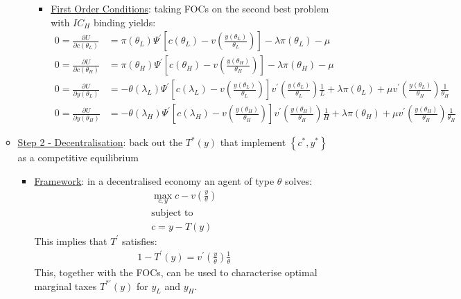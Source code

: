 \documentclass{article}
\begin{document}
\begin{itemize}
\begin{itemize}
\begin{itemize}
\begin{itemize}
                \item  \underline{First Order Conditions}: taking FOCs on the second best problem with $IC_{H}$ binding yields:
                \begin{align*}
                    0 = \frac{\partial U}{\partial c(\theta_{L})} &= \pi(\theta_{L}) \Psi^{'}[c(\theta_{L}) - v(\frac{y(\theta_{L})}{\theta_{L}})] - \lambda \pi(\theta_{L}) - \mu \tag{1} \\
                    0 = \frac{\partial U}{\partial c(\theta_{H})} &= \pi(\theta_{H}) \Psi^{'}[c(\theta_{H}) - v(\frac{y(\theta_{H})}{\theta_{H}})] - \lambda \pi(\theta_{H}) - \mu \tag{2} \\
                    0 = \frac{\partial U}{\partial y(\theta_{L})} &= -\theta(\lambda_{L}) \Psi^{'}[c(\lambda_{L}) - v(\frac{y(\theta_{L})}{\theta_{L}})] v^{'}(\frac{y(\theta_{L})}{\theta_{L}}) \frac{1}{L} + \lambda \pi(\theta_{L}) + \mu v^{'} (\frac{y(\theta_{L})}{\theta_{H}}) \frac{1}{\theta_{H}} \tag{3} \\
                    0 = \frac{\partial U}{\partial y(\theta_{H})} &= -\theta(\lambda_{H}) \Psi^{'}[c(\lambda_{H}) - v(\frac{y(\theta_{H})}{\theta_{H}})] v^{'}(\frac{y(\theta_{H})}{\theta_{H}}) \frac{1}{H} + \lambda \pi(\theta_{H}) + \mu v^{'} (\frac{y(\theta_{H})}{\theta_{H}}) \frac{1}{\theta_{H}} \tag{4}
                \end{align*}
            \end{itemize}
        \end{itemize}
        \item  \underline{Step 2 - Decentralisation}: back out the $T^{*}(y)$ that implement $\left\{ c^{*}, y^{*} \right\}$ as a competitive equilibrium
        \begin{itemize}
            \item  \underline{Framework}: in a decentralised economy an agent of type $\theta$ solves:
            \begin{gather*}
                \max_{c,y} c - v(\frac{y}{\theta}) \\
                \text{subject to} \\
                c = y - T(y)
            \end{gather*}
            This implies that $T^{'}$ satisfies:
            \begin{gather*}
                1 - T^{'}(y) = v^{'}(\frac{y}{\theta}) \frac{1}{\theta} \tag{5}
            \end{gather*}
            This, together with the FOCs, can be used to characterise optimal marginal taxes $T^{*'}(y)$ for $y_{L}$ and $y_{H}$.

\end{itemize}
\end{itemize}
\end{itemize}
\end{document}
